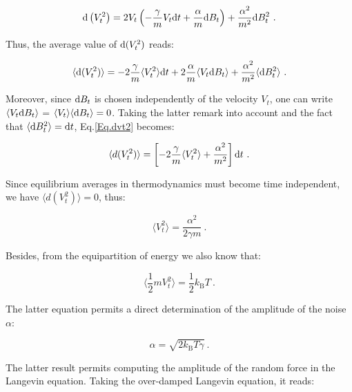 \begin{equation}
	\textnormal{d}\left(V_t^2\right) = 2V_t\left( -\frac{\gamma}{m}V_t\textnormal{d}t + \frac{\alpha}{m}\textnormal{d}B_t  \right) + \frac{\alpha^2}{m^2}\textnormal{d}B_t ^2 ~. 
\end{equation}

Thus, the average value of $ \textnormal{d}(V_t ^2)$ reads:

\begin{equation}
	\langle \textnormal{d}(V_t ^2)\rangle = -2 \frac{\gamma}{m} \langle V_t ^2 \rangle \textnormal dt + 2 \frac{\alpha}{m} \langle V_t \textnormal{d}B_t \rangle + \frac{\alpha^2}{m^2} \langle \textnormal{d}B_t ^2 \rangle~.
	\label{Eq.dvt2}
\end{equation} 

Moreover, since $\textnormal{d}B_t$ is chosen independently of the velocity $V_t$, one can write $\langle V_t \textnormal{d}B_t \rangle $ = $\langle V_t \rangle \langle \textnormal{d}B_t \rangle  =0 $. Taking the latter remark into account and the fact that $\langle \textnormal{d}B_t ^2\rangle = \textnormal{d}t $, Eq.\ref{Eq.dvt2} becomes:

\begin{equation}
	\langle d(V_t^2) \rangle = \left[-2 \frac{\gamma}{m} \langle V_t ^2 \rangle + \frac{\alpha^2}{m^2}\right]\textnormal{d}t~.
\end{equation}

Since equilibrium averages in thermodynamics must become time independent, we have $\langle d(V_t^2) \rangle = 0$, thus:

\begin{equation}
	\langle V_t ^2\rangle = \frac{\alpha ^2}{2 \gamma m}~. 
\end{equation}

Besides, from the equipartition of energy we also know that:

\begin{equation}
	\langle \frac{1}{2} m V_t ^2 \rangle  = \frac{1}{2} k_\mathrm{B} T~.
\end{equation}

The latter equation permits a direct determination of the amplitude of the noise $\alpha$: 

\begin{equation}
	\alpha = \sqrt{2k_\mathrm{B}T \gamma}~.
\end{equation}

The latter result permits computing the amplitude of the random force in the Langevin equation. Taking the over-damped Langevin equation, it reads:

